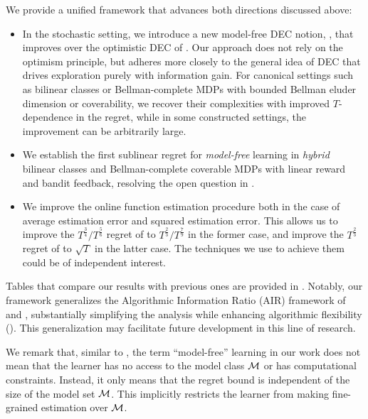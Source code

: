 We provide a unified framework that advances both directions discussed above: 
\begin{itemize}[leftmargin=1em, before=\vspace{0pt}, after=\vspace{0pt}]
 \setlength{\itemsep}{0pt} %
    \setlength{\parskip}{0pt} 
    \setlength{\topsep}{0pt}
\item In the stochastic setting, we introduce a new model-free DEC notion, \decname, that improves over the optimistic DEC of \cite{foster2024model}. Our approach does not rely on the optimism principle, but adheres more closely to the general idea of DEC that drives exploration purely with information gain. For canonical settings such as bilinear classes or Bellman-complete MDPs with bounded Bellman eluder dimension or coverability, we recover their complexities with improved $T$-dependence in the regret, while in some constructed settings, the improvement can be arbitrarily large. 
\item We establish the first sublinear regret for \emph{model-free} learning in \emph{hybrid} bilinear classes and Bellman-complete coverable MDPs with linear reward and bandit feedback, resolving the open question in \cite{liu2025decision}. 
\item We improve the online function estimation procedure both in the case of average estimation error and squared estimation error. This allows us to improve the $T^{\frac{3}{4}}/T^{\frac{5}{6}}$ regret of \cite{foster2024model} to $T^{\frac{2}{3}}/T^{\frac{7}{9}}$ in the former case, and improve the $T^\frac{2}{3}$ regret of \cite{foster2024model} to $\sqrt{T}$ in the latter case. The techniques we use to achieve them could be of independent interest. %
\end{itemize}
Tables that compare our results with previous ones are provided in . 
Notably, our framework generalizes the Algorithmic Information Ratio (AIR) framework of \cite{xu2023bayesian} and \cite{liu2025decision}, substantially simplifying the analysis while enhancing algorithmic flexibility (). This generalization may facilitate future development in this line of research. 





We remark that, similar to \cite{foster2024model}, the term ``model-free'' learning in our work does not mean that the learner has no access to the model class $\mathcal{M}$ or has computational constraints. Instead, it only means that the regret bound is independent of the size of the model set $\mathcal{M}$. This implicitly restricts the learner from making fine-grained estimation over $\mathcal{M}$. 




